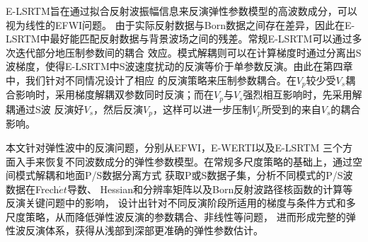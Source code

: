 \begin{cabstract}
	E-LSRTM旨在通过拟合反射波振幅信息来反演弹性参数模型的高波数成分，可以视为线性的EFWI问题。
	由于实际反射数据与Born数据之间存在差异，因此在E-LSRTM中最好能匹配反射数据与背景波场之间的残差。常规E-LSRTM可以通过多次迭代部分地压制参数间的耦合
	效应。模式解耦则可以在计算梯度时通过分离出S波梯度，使得E-LSRTM中S波速度扰动的反演等价于单参数反演。由此在第四章中，我们针对不同情况设计了相应
	的反演策略来压制参数耦合。在$V_p$较少受$V_s$耦合影响时，采用梯度解耦双参数同时反演；而在$V_p$与$V_s$强烈相互影响时，先采用解耦通过S波
	反演好$V_s$，然后反演$V_p$，这样可以进一步压制$V_p$所受到的来自$V_s$的耦合影响。

	本文针对弹性波中的反演问题，分别从EFWI，E-WERTI以及E-LSRTM
	三个方面入手来恢复不同波数成分的弹性参数模型。在常规多尺度策略的基础上，通过空间模式解耦和地面P/S数据分离方式
	获取P或S数据子集，分析不同模式的P/S波数据在Frech$\acute{e}t$导数、
	Hessian和分辨率矩阵以及Born反射波路径核函数的计算等反演关键问题中的影响，
	设计出针对不同反演阶段所适用的梯度与条件方式和多尺度策略，从而降低弹性波反演的参数耦合、非线性等问题，
	进而形成完整的弹性波反演体系，获得从浅部到深部更准确的弹性参数估计。


\end{cabstract}


